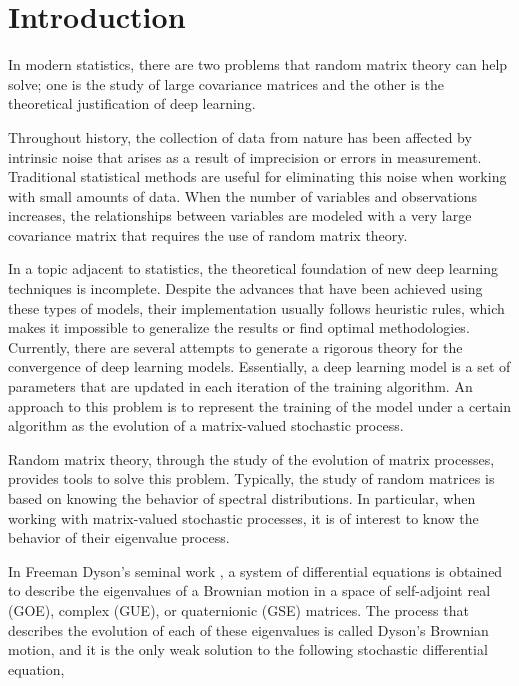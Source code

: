 \chapter*{Introduction}

In modern statistics, there are two problems that random matrix theory can help solve; one is the study of large covariance matrices and the other is the theoretical justification of deep learning.

Throughout history, the collection of data from nature has been affected by intrinsic noise that arises as a result of imprecision or errors in measurement. Traditional statistical methods are useful for eliminating this noise when working with small amounts of data. When the number of variables and observations increases, the relationships between variables are modeled with a very large covariance matrix that requires the use of random matrix theory.

In a topic adjacent to statistics, the theoretical foundation of new deep learning techniques is incomplete. Despite the advances that have been achieved using these types of models, their implementation usually follows heuristic rules, which makes it impossible to generalize the results or find optimal methodologies. Currently, there are several attempts to generate a rigorous theory for the convergence of deep learning models. Essentially, a deep learning model is a set of parameters that are updated in each iteration of the training algorithm. An approach to this problem is to represent the training of the model under a certain algorithm as the evolution of a matrix-valued stochastic process.

Random matrix theory, through the study of the evolution of matrix processes, provides tools to solve this problem. Typically, the study of random matrices is based on knowing the behavior of spectral distributions. In particular, when working with matrix-valued stochastic processes, it is of interest to know the behavior of their eigenvalue process.

In Freeman Dyson's seminal work \cite{article:dyson}, a system of differential equations is obtained to describe the eigenvalues of a Brownian motion in a space of self-adjoint real (GOE), complex (GUE), or quaternionic (GSE) matrices. The process that describes the evolution of each of these eigenvalues is called Dyson's Brownian motion, and it is the only weak solution to the following stochastic differential equation,


